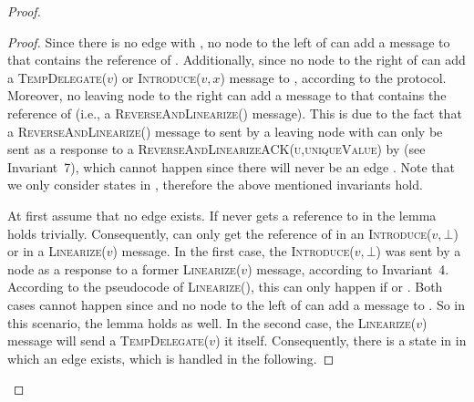 \documentclass[a4paper,USenglish]{lipics}
\newcommand{\linearize}[1]{\textsc{Linearize(\ensuremath{#1})}\xspace}
\newcommand{\introduce}[1]{\textsc{Introduce(\ensuremath{#1})}\xspace}
\newcommand{\tempdelegate}[1]{\textsc{TempDelegate(\ensuremath{#1})}\xspace}
\newcommand{\revandlin}[1]{\textsc{ReverseAndLinearize(\ensuremath{#1})}\xspace} \newcommand{\revandlinREQ}[1]{\textsc{ReverseAndLinearizeREQ(#1)}\xspace}
\newcommand{\revandlinACK}[1]{\textsc{ReverseAndLinearizeACK(#1)}\xspace}
\begin{document}
\begin{proof}
\begin{proof}
Since there is no edge  with , no node to the left of  can add a message to  that contains the reference of .
Additionally, since  no node  to the right of  can add a \tempdelegate{v} or \introduce{v,x} message to , according to the protocol.
Moreover, no leaving node to the right can add a message to  that contains the reference of  (i.e., a \revandlin{} message).
This is due to the fact that a \revandlin{} message to sent  by a leaving node  with  can only be sent as a response to a \revandlinACK{u,uniqueValue} by  (see Invariant~7), which cannot happen since there will never be an edge .
Note that we only consider states in , therefore the above mentioned invariants hold.

At first assume that no edge  exists.
If never gets a reference to  in  the lemma holds trivially.
Consequently,  can only get the reference of  in an \introduce{v,\bot} or in a \linearize{v}  message.
In the first case, the \introduce{v,\bot} was sent by a node  as a response to a former \linearize{v} message, according to Invariant~4.
According to the pseudocode of \linearize{}, this can only happen if  or .
Both cases cannot happen since  and no node to the left of  can add a message to .
So in this scenario, the lemma holds as well.
In the second case, the \linearize{v} message  will send a \tempdelegate{v} it itself.
Consequently, there is a state in  in which an edge  exists, which is handled in the following.


\end{proof}
\end{proof}
\end{document}
